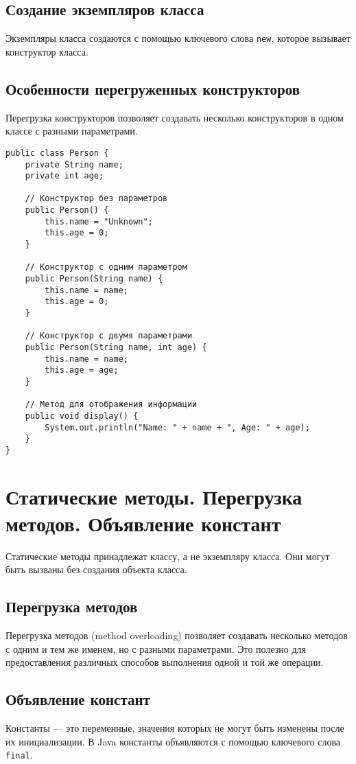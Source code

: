 \documentclass[12pt, a4paper]{article}
\begin{document}
\subsection*{Создание экземпляров класса}

Экземпляры класса создаются с помощью ключевого слова \texttt{new}, которое вызывает конструктор класса.

\subsection*{Особенности перегруженных конструкторов}
Перегрузка конструкторов позволяет создавать несколько конструкторов в одном классе с разными параметрами.

\begin{verbatim}
public class Person {
    private String name;
    private int age;

    // Конструктор без параметров
    public Person() {
        this.name = "Unknown";
        this.age = 0;
    }

    // Конструктор с одним параметром
    public Person(String name) {
        this.name = name;
        this.age = 0;
    }

    // Конструктор с двумя параметрами
    public Person(String name, int age) {
        this.name = name;
        this.age = age;
    }

    // Метод для отображения информации
    public void display() {
        System.out.println("Name: " + name + ", Age: " + age);
    }
}
\end{verbatim}


\section{Статические методы. Перегрузка методов. Объявление констант}
Статические методы принадлежат классу, а не экземпляру класса. Они могут быть вызваны без создания объекта класса.

\subsection*{Перегрузка методов}
Перегрузка методов (method overloading) позволяет создавать несколько методов с одним и тем же именем, но с разными параметрами. Это полезно для предоставления различных способов выполнения одной и той же операции.

\subsection*{Объявление констант}
Константы — это переменные, значения которых не могут быть изменены после их инициализации. В Java константы объявляются с помощью ключевого слова \texttt{final}.
\end{document}
